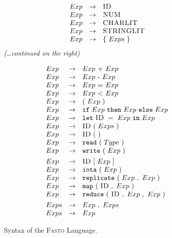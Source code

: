 \documentclass[a4paper,11pt]{article}
\newcommand{\fasto}{\textsc{Fasto}\xspace}
\begin{document}
\begin{figure}[t!]
\begin{minipage}{0.5\textwidth}
\[\begin{array}{lcl}
Exp & \rightarrow & \mbox{\sc ID} \\
Exp & \rightarrow & \mbox{\sc NUM} \\
Exp & \rightarrow & \mbox{\sc CHARLIT} \\
Exp & \rightarrow & \mbox{\sc STRINGLIT} \\
Exp & \rightarrow & \{ \ Exps\ \}\\
\end{array}
\]
\hspace*{2em}\textit{(\ldots continued on the right)}
\end{minipage}\hspace*{2em}
\begin{minipage}{0.5\textwidth}
\[
\begin{array}{lcl}
Exp & \rightarrow & Exp \ \tok{+} \ Exp \\
Exp & \rightarrow & Exp \ \tok{-} \ Exp \\
Exp & \rightarrow & Exp \ \tok{=}\ Exp \\
Exp & \rightarrow & Exp \ \tok{<} \ Exp \\
Exp & \rightarrow & ( \ Exp \  )\\
Exp & \rightarrow &  \keyw{if}\ Exp\ \keyw{then}\ Exp\ \keyw{else}\ Exp \\
Exp & \rightarrow & \keyw{let} \  \tok{ID} \ = \ Exp \ \keyw{in} \ Exp\\
Exp & \rightarrow & \tok{ID} \ ( \ Exps \  )\\
Exp & \rightarrow & \tok{ID} \ (\ ) \\
Exp & \rightarrow & \keyw{read} \ ( \ Type \ )\\
Exp & \rightarrow & \keyw{write} \ ( \ Exp \ )\\[0.9ex]
Exp & \rightarrow & \tok{ID} \ [ \ Exp \ ]\\
Exp & \rightarrow & \keyw{iota} \ ( \ Exp \ )\\
Exp & \rightarrow & \keyw{replicate} \ ( \ Exp \ , \ Exp \  )\\
Exp & \rightarrow & \keyw{map} \ ( \ \tok{ID} \ , \ Exp \ )\\
Exp & \rightarrow & \keyw{reduce} \ ( \ \tok{ID} \ , \ Exp \ , \ Exp \ )\\[0.9ex]

Exps & \rightarrow & Exp \ , \ Exps\\
Exps & \rightarrow & Exp \\

\end{array}
\]
\end{minipage}
\renewcommand{\arraystretch}{1.0}
\caption{Syntax of the \fasto Language.}
\label{fig:FastoGram1}
\end{figure}
\end{document}
